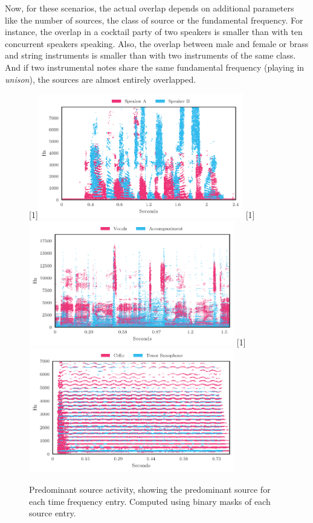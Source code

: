 Now, for these scenarios, the actual overlap depends on additional parameters like the number of sources, the class of source or the fundamental frequency.
For instance, the overlap in a cocktail party of two speakers is smaller than with ten concurrent speakers speaking.
Also, the overlap between male and female or brass and string instruments is smaller than with two instruments of the same class. 
And if two instrumental notes share the same fundamental frequency (playing in \emph{unison}), the sources are almost entirely overlapped.
\par
\begin{figure}[hb]
\centering
{}%
[1\textwidth]{\includegraphics[width=0.8\textwidth]{gfx/dominance_map_speakers.pdf}}%
\hspace{0.2\textwidth} %
[1\textwidth]{\includegraphics[width=0.8\textwidth]{gfx/dominance_map_vocacc.pdf}}%
\hspace{0.2\textwidth} %
[1\textwidth]{\includegraphics[width=0.8\textwidth]{gfx/dominance_map_unison.pdf}}%
\caption{Predominant source activity, showing the predominant source for each time  frequency entry. Computed using binary masks of each source entry.}
\label{fig:dominance}
\end{figure}

